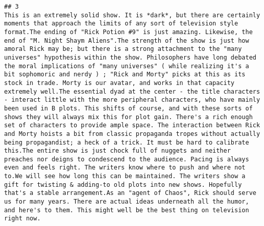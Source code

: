 \documentclass[
]{article}
\begin{document}
\begin{verbatim}
## 3                                                                                                                                                                                                                                                                                                                                                                                                                                                                                                                                                                                                                                                                                                                                        This is an extremely solid show. It is *dark*, but there are certainly moments that approach the limits of any sort of television style format.The ending of "Rick Potion #9" is just amazing. Likewise, the end of "M. Night Shaym Aliens".The strength of the show is just how amoral Rick may be; but there is a strong attachment to the "many universes" hypothesis within the show. Philosophers have long debated the moral implications of "many universes" ( while realizing it's a bit sophomoric and nerdy ) ; "Rick and Morty" picks at this as its stock in trade. Morty is our avatar, and works in that capacity extremely well.The essential dyad at the center - the title characters - interact little with the more peripheral characters, who have mainly been used in B plots. This shifts of course, and with these sorts of shows they will always mix this for plot gain. There's a rich enough set of characters to provide ample space. The interaction between Rick and Morty hoists a bit from classic propaganda tropes without actually being propagandist; a heck of a trick. It must be hard to calibrate this.The entire show is just chock full of nuggets and neither preaches nor deigns to condescend to the audience. Pacing is always even and feels right. The writers know where to push and where not to.We will see how long this can be maintained. The writers show a gift for twisting & adding-to old plots into new shows. Hopefully that's a stable arrangement.As an "agent of Chaos", Rick should serve us for many years. There are actual ideas underneath all the humor, and here's to them. This might well be the best thing on television right now.

\end{verbatim}
\end{document}
